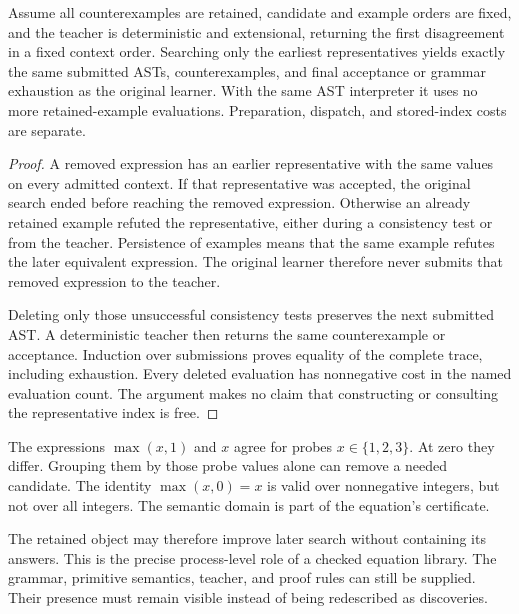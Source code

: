 \begin{Coretheorem}\label{Core:r:ordered}
Assume all counterexamples are retained, candidate and example orders are fixed, and the teacher is deterministic and extensional, returning the first disagreement in a fixed context order. Searching only the earliest representatives yields exactly the same submitted ASTs, counterexamples, and final acceptance or grammar exhaustion as the original learner. With the same AST interpreter it uses no more retained-example evaluations. Preparation, dispatch, and stored-index costs are separate.
\end{Coretheorem}
\begin{proof}
A removed expression has an earlier representative with the same values on every admitted context. If that representative was accepted, the original search ended before reaching the removed expression. Otherwise an already retained example refuted the representative, either during a consistency test or from the teacher. Persistence of examples means that the same example refutes the later equivalent expression. The original learner therefore never submits that removed expression to the teacher.

Deleting only those unsuccessful consistency tests preserves the next submitted AST. A deterministic teacher then returns the same counterexample or acceptance. Induction over submissions proves equality of the complete trace, including exhaustion. Every deleted evaluation has nonnegative cost in the named evaluation count. The argument makes no claim that constructing or consulting the representative index is free.
\end{proof}

\begin{Corecounterexample}\label{Core:ce:probe}
The expressions $\max(x,1)$ and $x$ agree for probes $x\in\{1,2,3\}$. At zero they differ. Grouping them by those probe values alone can remove a needed candidate. The identity $\max(x,0)=x$ is valid over nonnegative integers, but not over all integers. The semantic domain is part of the equation's certificate.
\end{Corecounterexample}

The retained object may therefore improve later search without containing its answers. This is the precise process-level role of a checked equation library. The grammar, primitive semantics, teacher, and proof rules can still be supplied. Their presence must remain visible instead of being redescribed as discoveries.

